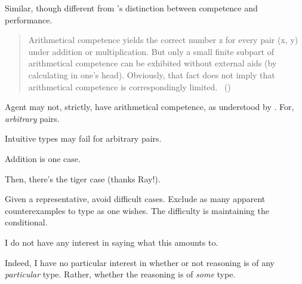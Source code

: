 \begin{note}
  Similar, though different from \citeauthor{Chomsky:2015aa}'s distinction between competence and performance.

  \begin{quote}
    Arithmetical competence yields the correct number z for every pair (x, y) under addition or multiplication.
    But only a small finite subpart of arithmetical competence can be exhibited without external aids (by calculating in one's head).
    Obviously, that fact does not imply that arithmetical competence is correspondingly limited.\newline
    \mbox{ }\hfill\mbox{(\citeyear[xii]{Chomsky:2015aa})}
  \end{quote}

  Agent may not, strictly, have arithmetical competence, as understood by \citeauthor{Chomsky:2015aa}.
  For, \emph{arbitrary} pairs.

  Intuitive types may fail for arbitrary pairs.

  Addition is one case.

  Then, there's the tiger case (thanks Ray!).

  Given a representative, avoid difficult cases.
  Exclude as many apparent counterexamples to type as one wishes.
  The difficulty is maintaining the conditional.

  I do not have any interest in saying what this amounts to.

  Indeed, I have no particular interest in whether or not reasoning is of any \emph{particular} type.
  Rather, whether the reasoning is of \emph{some} type.
\end{note}


\section{}
\label{sec:sr2-1}

